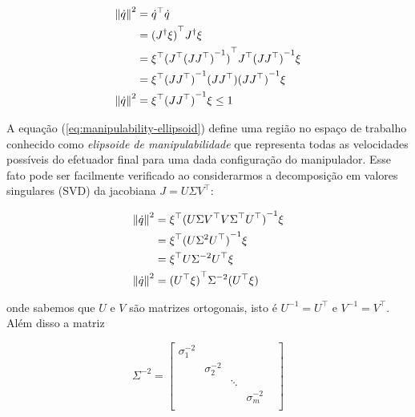\begin{align}\label{eq:manipulability-ellipsoid}
    \left\Vert \dot{q} \right\Vert^2 & = \dot{q}^\top \dot{q} \notag                                                    \\
                                     & = {(J^\dag \xi)}^\top J^\dag \xi \notag                                          \\
                                     & = \xi^\top {(J^\top {(J J^\top)}^{-1})}^\top J^\top {(J J^\top)}^{-1} \xi \notag \\
                                     & = \xi^\top {(J J^\top)}^{-1} (J J^\top) {(J J^\top)}^{-1} \xi \notag             \\
    \left\Vert \dot{q} \right\Vert^2 & = \xi^\top {(J J^\top)}^{-1} \xi \leq 1
\end{align}

A equação (\ref{eq:manipulability-ellipsoid}) define uma região no espaço de
trabalho conhecido como \emph{elipsoide de manipulabilidade} que representa
todas as velocidades possíveis do efetuador final para uma dada configuração do
manipulador. Esse fato pode ser facilmente verificado ao considerarmos a
decomposição em valores singulares (SVD) da jacobiana \(J = U \Sigma V^\top\):

\begin{align}\label{eq:manipulability-ellipsoid-svd}
    \left\Vert \dot{q} \right\Vert^2 & = \xi^\top {(U \Sigma V^\top V \Sigma^\top U^\top)}^{-1} \xi \notag \\
                                     & = \xi^\top {(U \Sigma^2 U^\top)}^{-1} \xi \notag                    \\
                                     & = \xi^\top U \Sigma^{-2} U^\top \xi \notag                          \\
    \left\Vert \dot{q} \right\Vert^2 & = {(U^\top \xi)}^\top \Sigma^{-2} (U^\top \xi)
\end{align}

onde sabemos que \(U\) e \(V\) são matrizes ortogonais, isto é \(U^{-1} =
U^\top\) e \(V^{-1} = V^\top\). Além disso a matriz

\begin{equation}
    \Sigma^{-2} = \begin{bmatrix}
        \sigma_1^{-2} &               &        &               & \\
                      & \sigma_2^{-2} &        &               & \\
                      &               & \ddots &               & \\
                      &               &        & \sigma_m^{-2} & \\
    \end{bmatrix}
\end{equation}


